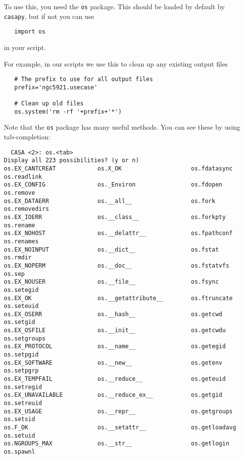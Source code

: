 To use this, you need the {\tt os} package.  This should be loaded
by default by {\tt casapy}, but if not you can use
\small
\begin{verbatim}
   import os
\end{verbatim}
\normalsize
in your script.

For example, in our scripts we use this to clean up any existing
output files
\small
\begin{verbatim}
   # The prefix to use for all output files
   prefix='ngc5921.usecase'

   # Clean up old files
   os.system('rm -rf '+prefix+'*')
\end{verbatim}
\normalsize

Note that the {\tt os} package has many useful methods.  You can
see these by using tab-completion:
\small
\begin{verbatim}
  CASA <2>: os.<tab>      
Display all 223 possibilities? (y or n)
os.EX_CANTCREAT            os.X_OK                    os.fdatasync               os.readlink
os.EX_CONFIG               os._Environ                os.fdopen                  os.remove
os.EX_DATAERR              os.__all__                 os.fork                    os.removedirs
os.EX_IOERR                os.__class__               os.forkpty                 os.rename
os.EX_NOHOST               os.__delattr__             os.fpathconf               os.renames
os.EX_NOINPUT              os.__dict__                os.fstat                   os.rmdir
os.EX_NOPERM               os.__doc__                 os.fstatvfs                os.sep
os.EX_NOUSER               os.__file__                os.fsync                   os.setegid
os.EX_OK                   os.__getattribute__        os.ftruncate               os.seteuid
os.EX_OSERR                os.__hash__                os.getcwd                  os.setgid
os.EX_OSFILE               os.__init__                os.getcwdu                 os.setgroups
os.EX_PROTOCOL             os.__name__                os.getegid                 os.setpgid
os.EX_SOFTWARE             os.__new__                 os.getenv                  os.setpgrp
os.EX_TEMPFAIL             os.__reduce__              os.geteuid                 os.setregid
os.EX_UNAVAILABLE          os.__reduce_ex__           os.getgid                  os.setreuid
os.EX_USAGE                os.__repr__                os.getgroups               os.setsid
os.F_OK                    os.__setattr__             os.getloadavg              os.setuid
os.NGROUPS_MAX             os.__str__                 os.getlogin                os.spawnl

\end{verbatim}
